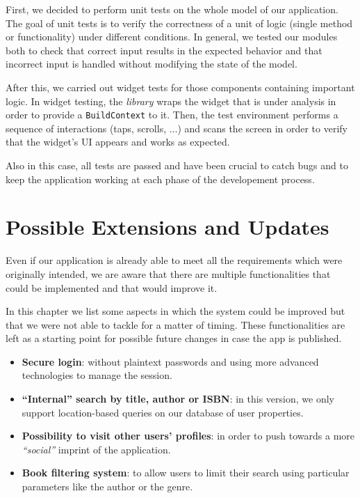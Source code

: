 First, we decided to perform unit tests on the whole model of our application.
The goal of unit tests is to verify the correctness of a unit of logic (single method or functionality) under different conditions.
In general, we tested our modules both to check that correct input results in the expected behavior and that incorrect input is handled without modifying the state of the model.

After this, we carried out widget tests for those components containing important logic.
In widget testing, the \emph{library} wraps the widget that is under analysis in order to provide a \texttt{BuildContext} to it.
Then, the test environment performs a sequence of interactions (taps, scrolls, ...) and scans the screen in order to verify that the widget's UI appears and works as expected.

Also in this case, all tests are passed and have been crucial to catch bugs and to keep the application working at each phase of the developement process.



\chapter{Possible Extensions and Updates}
Even if our application is already able to meet all the requirements which were originally intended, we are aware that there are multiple functionalities that could be implemented and that would improve it.

In this chapter we list some aspects in which the system could be improved but that we were not able to tackle for a matter of timing.
These functionalities are left as a starting point for possible future changes in case the app is published.

\begin{itemize}
      \item \textbf{Secure login}: without plaintext passwords and using more advanced technologies to manage the session.
      \item \textbf{``Internal'' search by title, author or ISBN}: in this version, we only support location-based queries on our database of user properties.
      \item \textbf{Possibility to visit other users' profiles}: in order to push towards a more \emph{``social''} imprint of the application.
      \item \textbf{Book filtering system}: to allow users to limit their search using particular parameters like the author or the genre.
\end{itemize}

